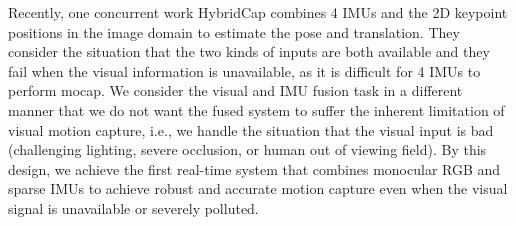 %
Recently, one concurrent work HybridCap \cite{HybridCap} combines 4 IMUs and the 2D keypoint positions in the image domain to estimate the pose and translation.
%
They consider the situation that the two kinds of inputs are both available and they fail when the visual information is unavailable, as it is difficult for 4 IMUs to perform mocap.
%
We consider the visual and IMU fusion task in a different manner that we do not want the fused system to suffer the inherent limitation of visual motion capture, i.e., we handle the situation that the visual input is bad (challenging lighting, severe occlusion, or human out of viewing field).
%
By this design, we achieve the first real-time system that combines monocular RGB and sparse IMUs to achieve robust and accurate motion capture even when the visual signal is unavailable or severely polluted.
%